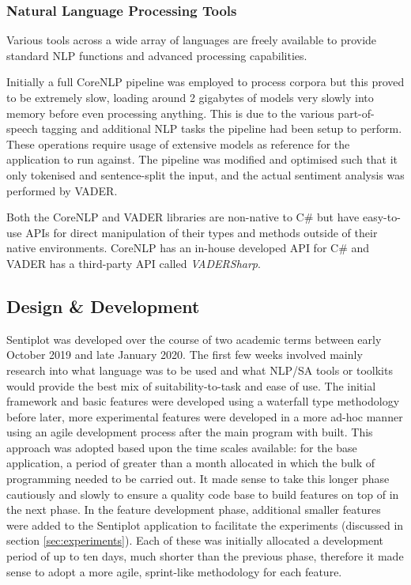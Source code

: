 \documentclass{article}
\begin{document}
{        \subsubsection{Natural Language Processing Tools}
        \label{subsec:nlpTools}
        Various tools across a wide array of languages are freely available to provide standard NLP functions and advanced processing capabilities.

        Initially a full CoreNLP pipeline was employed to process corpora but this proved to be extremely slow, loading around 2 gigabytes of models very slowly into memory before even processing anything. This is due to the various part-of-speech tagging and additional NLP tasks the pipeline had been setup to perform. These operations require usage of extensive models as reference for the application to run against. The pipeline was modified and optimised such that it only tokenised and sentence-split the input, and the actual sentiment analysis was performed by VADER.

        Both the CoreNLP and VADER libraries are non-native to C\# but have easy-to-use APIs for direct manipulation of their types and methods outside of their native environments. CoreNLP has an in-house developed API for C\# and VADER has a third-party API called \textit{VADERSharp}.
    \subsection{Design \& Development}
    \label{subsec:dnd}
        Sentiplot was developed over the course of two academic terms between early October 2019 and late January 2020. The first few weeks involved mainly research into what language was to be used and what NLP/SA tools or toolkits would provide the best mix of suitability-to-task and ease of use. The initial framework and basic features were developed using a waterfall type methodology before later, more experimental features were developed in a more ad-hoc manner using an agile development process after the main program with built. This approach was adopted based upon the time scales available: for the base application, a period of greater than a month allocated in which the bulk of programming needed to be carried out. It made sense to take this longer phase cautiously and slowly to ensure a quality code base to build features on top of in the next phase. In the feature development phase, additional smaller features were added to the Sentiplot application to facilitate the experiments (discussed in section \ref{sec:experiments}). Each of these was initially allocated a development period of up to ten days, much shorter than the previous phase, therefore it made sense to adopt a more agile, sprint-like methodology for each feature.
        
}
\end{document}
